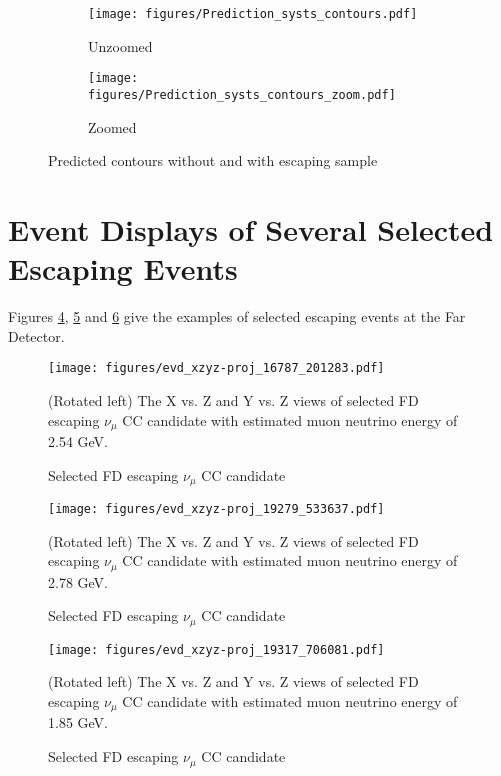 \begin{figure}[!th]
\centering
\begin{subfigure}[t]{0.95\textwidth}
  \centering
  \texttt{[image: figures/Prediction\_systs\_contours.pdf]}
  \caption{ Unzoomed }
  \label{fig:cont_pred_unzoom}
\end{subfigure}
\vspace{0.5cm}
\newline
\begin{subfigure}[t]{0.95\textwidth}
  \centering
  \texttt{[image: figures/Prediction\_systs\_contours\_zoom.pdf]}
  \caption{ Zoomed }
  \label{fig:cont_pred_zoom}
\end{subfigure}
\caption{ Predicted contours without and with escaping sample }
{}
\label{fig:cont_pred}
\end{figure}

\section{Event Displays of Several Selected Escaping Events}
Figures \ref{fig:candidate1}, \ref{fig:candidate2} and \ref{fig:candidate3} give the examples of selected escaping 
events at the Far Detector.
\clearpage
\begin{figure}[!th]
\centering
\texttt{[image: figures/evd\_xzyz-proj\_16787\_201283.pdf]}
\caption{Selected FD escaping $\nu_\mu$ CC candidate}
{(Rotated left) The X vs. Z and Y vs. Z views of selected FD escaping $\nu_\mu$ CC candidate with estimated muon 
neutrino energy of 2.54 GeV.}
\label{fig:candidate1}
\end{figure}

\clearpage
\begin{figure}[!th]
\centering
\texttt{[image: figures/evd\_xzyz-proj\_19279\_533637.pdf]}
\caption{Selected FD escaping $\nu_\mu$ CC candidate}
{(Rotated left) The X vs. Z and Y vs. Z views of selected FD escaping $\nu_\mu$ CC candidate with estimated muon
neutrino energy of 2.78 GeV.}
\label{fig:candidate2}
\end{figure}

\clearpage
\begin{figure}[!th]
\centering
\texttt{[image: figures/evd\_xzyz-proj\_19317\_706081.pdf]}
\caption{Selected FD escaping $\nu_\mu$ CC candidate}
{(Rotated left) The X vs. Z and Y vs. Z views of selected FD escaping $\nu_\mu$ CC candidate with estimated muon
neutrino energy of 1.85 GeV.}
\label{fig:candidate3}
\end{figure}

